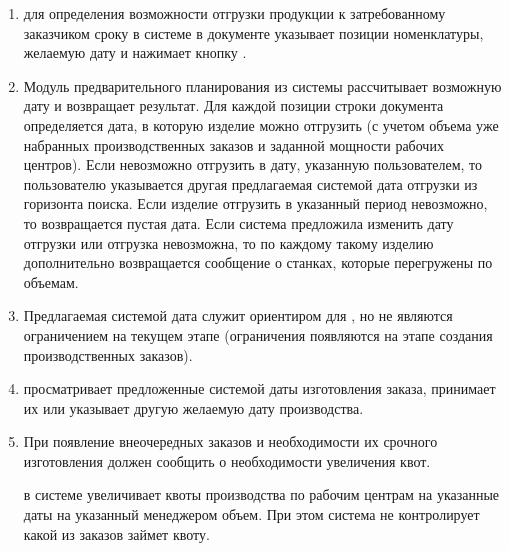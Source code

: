 \begin{enumerate}

\item \manager для определения возможности отгрузки продукции к затребованному заказчиком сроку в системе \gofro  в документе  указывает позиции номенклатуры, желаемую дату и нажимает кнопку . %
\item Модуль предварительного планирования из системы \gofro рассчитывает возможную дату и возвращает результат. Для каждой позиции строки документа  определяется дата, в которую изделие можно отгрузить (с учетом объема уже набранных производственных заказов и заданной мощности рабочих центров). Если невозможно отгрузить в дату, указанную пользователем, то пользователю указывается другая предлагаемая системой \gofro дата отгрузки из горизонта поиска. Если изделие отгрузить в указанный период невозможно, то возвращается пустая дата. Если система \gofro предложила изменить дату отгрузки или отгрузка невозможна, то по каждому такому изделию дополнительно возвращается сообщение о станках, которые перегружены по объемам. 

\item	Предлагаемая системой \gofro дата служит ориентиром для \manager, но не являются ограничением на текущем этапе (ограничения появляются на этапе создания производственных заказов).
\item	\manager просматривает предложенные системой \gofro даты изготовления заказа, принимает их или указывает другую желаемую дату производства.

\item	При появление внеочередных заказов и необходимости их срочного изготовления \manager должен сообщить \planner о необходимости увеличения квот.

\planner в системе \gofro увеличивает квоты производства по рабочим центрам на указанные даты на указанный менеджером объем. При этом система не контролирует какой из заказов займет квоту.


\end{enumerate}
